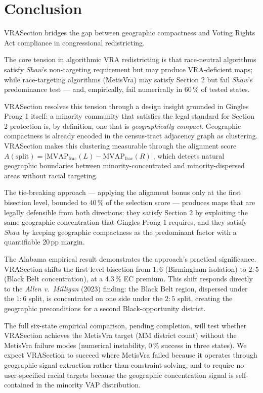 \section{Conclusion}
\label{sec:conclusion}

VRASection bridges the gap between geographic compactness and Voting Rights
Act compliance in congressional redistricting.

The core tension in algorithmic VRA redistricting is that race-neutral
algorithms satisfy \emph{Shaw}'s non-targeting requirement but may produce
VRA-deficient maps; while race-targeting algorithms (MetisVra) may satisfy
Section 2 but fail \emph{Shaw}'s predominance test --- and, empirically,
fail numerically in 60\,\% of tested states.

VRASection resolves this tension through a design insight grounded in
Gingles Prong 1 itself: a minority community that satisfies the legal
standard for Section 2 protection is, by definition, one that is
\emph{geographically compact}.
Geographic compactness is already encoded in the census-tract adjacency
graph as clustering.
VRASection makes this clustering measurable through the alignment score
$A(\text{split}) = |\mathrm{MVAP}_\text{frac}(L) - \mathrm{MVAP}_\text{frac}(R)|$,
which detects natural geographic boundaries between minority-concentrated
and minority-dispersed areas without racial targeting.

The tie-breaking approach --- applying the alignment bonus only at the
first bisection level, bounded to 40\,\% of the selection score --- produces
maps that are legally defensible from both directions:
they satisfy Section 2 by exploiting the same geographic concentration that
Gingles Prong 1 requires, and they satisfy \emph{Shaw} by keeping geographic
compactness as the predominant factor with a quantifiable 20\,pp margin.

The Alabama empirical result demonstrates the approach's practical significance.
VRASection shifts the first-level bisection from $1:6$ (Birmingham isolation)
to $2:5$ (Black Belt concentration), at a 4.3\,\% EC premium.
This shift responds directly to the \emph{Allen v.\ Milligan} (2023) finding:
the Black Belt region, dispersed under the $1:6$ split, is concentrated on
one side under the $2:5$ split, creating the geographic preconditions for
a second Black-opportunity district.

The full six-state empirical comparison, pending completion, will test whether
VRASection achieves the MetisVra target (MM district count) without the
MetisVra failure modes (numerical instability, 0\,\% success in three states).
We expect VRASection to succeed where MetisVra failed because it operates
through geographic signal extraction rather than constraint solving,
and to require no user-specified racial targets because the geographic
concentration signal is self-contained in the minority VAP distribution.

